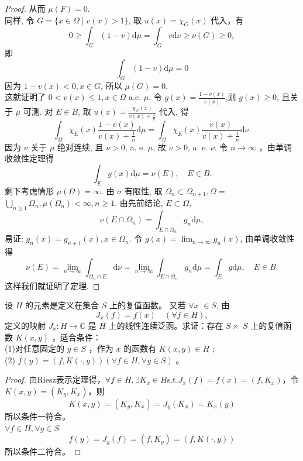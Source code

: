 \documentclass[lang=cn,newtx,10pt,scheme=chinese,thmcnt=chapter]{elegantbook}
\newcommand{\dif}{\mathrm{d}}
\begin{document}
\begin{proof}
从而 $\mu(F)=0$.\\
同样, 令 $G=\{x \in \Omega \mid v(x)>1\}$, 取 $u(x)=\chi_G(x)$ 代入，有
\begin{equation*}
0 \geqslant \int_G(1-v) \dif \mu=\int_G v \dif \nu \geqslant \nu(G) \geqslant 0,
\end{equation*}
即
\begin{equation*}
\int_G(1-v) \dif \mu=0
\end{equation*}
因为 $1-v(x)<0, x \in G$, 所以 $\mu(G)=0$.\\
这就证明了 $0<v(x) \leqslant 1, x \in \Omega$ a.e. $\mu$. 令 $g(x)=\frac{1-v(x)}{v(x)}$,则 $g(x) \geqslant 0$, 且关于 $\mu$ 可测. 对 $E \in B$, 取 $u(x)=\frac{\chi_E(x)}{v(x)+\frac{1}{n}}$ 代入, 得
\begin{equation*}
\int_{\Omega} \chi_E(x) \frac{1-v(x)}{v(x)+\frac{1}{n}} \dif \mu=\int_{\Omega} \chi_E(x) \frac{v(x)}{v(x)+\frac{1}{n}} \dif \nu .
\end{equation*}
因为 $\nu$ 关于 $\mu$ 绝对连续, 且 $\nu>0$, a. e. $\mu$, 故 $\nu>0$, a. e. $\nu$. 令 $n \rightarrow \infty$ ，由单调收敛性定理得
\begin{equation*}
\int_E g(x) \dif \mu=\nu(E), \quad E \in B .
\end{equation*}
剩下考虑情形 $\mu(\Omega)=\infty$. 由 $\sigma$ 有限性, 取 $\Omega_n \subset \Omega_{n+1}, \Omega=$ $\bigcup_{n \geqslant 1} \Omega_n, \mu\left(\Omega_n\right)<\infty, n \geqslant 1$. 由先前结论, $E \subset \Omega$,
\begin{equation*}
\nu\left(E \cap \Omega_n\right)=\int_{E \cap \Omega_n} g_n \dif \mu,
\end{equation*}
易证: $g_n(x)=g_{n+1}(x), x \in \Omega_n$. 令 $g(x)=\lim _{n \rightarrow \infty} g_n(x)$, 由单调收敛性得
\begin{equation*}
\nu(E)=\lim _{n \rightarrow \infty} \int_{\Omega_n \cap E} \dif \nu=\lim _{n \rightarrow \infty} \int_{E \cap \Omega_n} g_n \dif \mu=\int_E g \dif \mu, \quad E \in B .
\end{equation*}
这样我们就证明了定理.

\end{proof}
\begin{problem}
设 $H$ 的元素是定义在集合 $S$ 上的复值函数。 又若 $\forall x$ $\in S$, 由
\begin{equation*}
J_x(f)=f(x) \quad(\forall f \in H),
\end{equation*}
定义的映射 $J_x: H \rightarrow \mathbb{C}$ 是 $H$ 上的线性连续泛函。求证：存在 $S \times$ $S$ 上的复值函数 $K(x, y)$ ，适合条件：\\
(1)对任意固定的 $y \in S$ ，作为 $x$ 的函数有 $K(x, y) \in H$ ;\\
(2) $f(y)=(f, K(\cdot, y))(\forall f \in H, \forall y \in S)$ 。
\end{problem}
\begin{proof}
由Riesz表示定理得，$\forall f\in H,\exists K_x\in H$s.t.$J_x(f)=f(x)=(f,K_x)$，令$K(x,y)=(K_y,K_x)$，则\[
K(x,y)=(K_y,K_x)=J_y(K_x)=K_x(y)
\]
所以条件一符合。\\
$\forall f \in H, \forall y \in S$ 
\[f(y)=J_y(f)=(f,K_y)=(f,K(\cdot,y))\]
所以条件二符合。
\end{proof}
\end{document}
